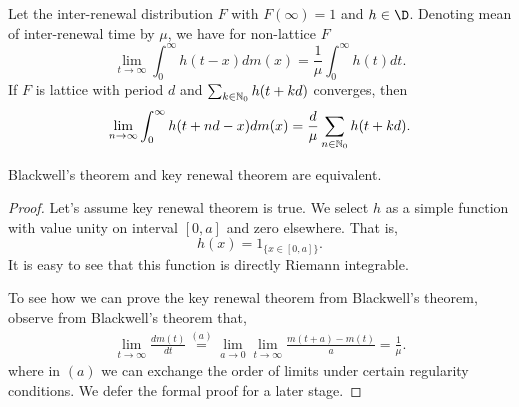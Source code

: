 \documentclass[a4paper,10pt,english]{article}
\begin{document}
\begin{thm} 
Let the inter-renewal distribution $F$ with $F(\infty) = 1$ and $h \in \D$. 
Denoting mean of inter-renewal time by $\mu$, we have for non-lattice $F$
\begin{equation}
\label{eqn:Key Renewal Theorem}
\lim_{t \rightarrow \infty} \int_{0}^{\infty}h(t-x)dm(x)=\frac{1}{\mu}\int_{0}^{\infty}h(t)dt. 
\end{equation}
If $F$ is lattice with period $d$ and $\sum_{k \in \mathbb{N}_0}h(t+kd)$ converges, then 
\begin{align*}
\lim_{n \rightarrow \infty} \int_{0}^{\infty}h(t+nd-x)dm(x)=\frac{d}{\mu}\sum_{n \in \mathbb{N}_0}h(t+kd). 
\end{align*}
\end{thm}
\begin{prop}[Equivalence] Blackwell's theorem and key renewal theorem are equivalent.
\end{prop}
\begin{proof} Let's assume key renewal theorem is true. We select $h$ as a simple function with value unity on interval $[0, a]$ and zero elsewhere. That is,
\begin{equation*}
h(x) = 1_{\{ x \in [0,a]\}}.
\end{equation*}
It is easy to see that this function is directly Riemann integrable. %

To see how we can prove the key renewal theorem from Blackwell's theorem, observe from Blackwell's theorem that,
\begin{align*}
\lim_{t \to \infty}\frac{dm(t)}{dt} \stackrel{(a)}= \lim_{a \to 0}\lim_{t \to \infty} \frac{m(t
+a)-m(t)}{a}=\frac{1}{\mu}.
\end{align*}     
where in $(a)$ we can exchange the order of limits under certain regularity conditions. 
We defer the formal proof for a later stage.
\end{proof}
\end{document}

